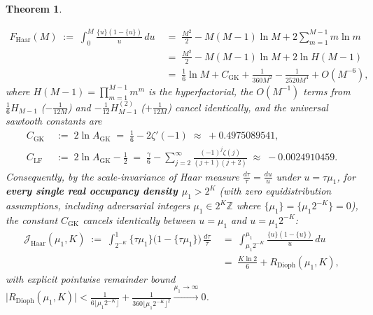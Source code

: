 \documentclass[11pt,reqno]{amsart}
\newtheorem{theorem}{Theorem}[section]
\theoremstyle{definition}
\theoremstyle{remark}
\begin{document}
\begin{theorem}
\begin{enumerate}
  \begin{equation}\label{eq:hyperfactorial_sawtooth_antiderivative}
    \begin{aligned}
      F_{\mathrm{Haar}}(M) \;:=\; \int_0^M \frac{\{u\}(1 - \{u\})}{u}\,du &\;=\; \frac{M^2}{2} - M(M - 1)\ln M + 2\sum_{m=1}^{M-1} m \ln m \\
      &\;=\; \frac{M^2}{2} - M(M - 1)\ln M + 2\ln H(M - 1) \\
      &\;=\; \frac{1}{6}\ln M + C_{\mathrm{GK}} + \frac{1}{360 M^2} - \frac{1}{2520 M^4} + O(M^{-6}),
    \end{aligned}
  \end{equation}
  where $H(M - 1) = \prod_{m=1}^{M-1} m^m$ is the hyperfactorial, the $O(M^{-1})$ terms from $\frac{1}{6}H_{M-1}$ ($-\frac{1}{12M}$) and $-\frac{1}{12}H_{M-1}^{(2)}$ ($+\frac{1}{12M}$) cancel identically, and the universal sawtooth constants are
  \begin{equation}\label{eq:glaisher_kinkelin_sawtooth_constants}
    \begin{aligned}
      C_{\mathrm{GK}} &\;:=\; 2\ln A_{\mathrm{GK}} \;=\; \frac{1}{6} - 2\zeta'(-1) \;\approx\; +0.4975089541, \\
      C_{\mathrm{LF}} &\;:=\; 2\ln A_{\mathrm{GK}} - \frac{1}{2} \;=\; \frac{\gamma}{6} - \sum_{j=2}^\infty \frac{(-1)^j \zeta(j)}{(j + 1)(j + 2)} \;\approx\; -0.0024910459.
    \end{aligned}
  \end{equation}
  Consequently, by the scale-invariance of Haar measure $\frac{d\tau}{\tau} = \frac{du}{u}$ under $u = \tau \mu_1$, for \textbf{every single real occupancy density $\mu_1 > 2^K$} (with zero equidistribution assumptions, including adversarial integers $\mu_1 \in 2^K \mathbb{Z}$ where $\{\mu_1\} = \{\mu_1 2^{-K}\} = 0$), the constant $C_{\mathrm{GK}}$ cancels identically between $u = \mu_1$ and $u = \mu_1 2^{-K}$:
  \begin{equation}\label{eq:pointwise_diophantine_dilation}
    \begin{aligned}
      \mathcal{J}_{\mathrm{Haar}}(\mu_1, K) \;:=\; \int_{2^{-K}}^1 \{\tau \mu_1\}\bigl(1 - \{\tau \mu_1\}\bigr)\,\frac{d\tau}{\tau} &\;=\; \int_{\mu_1 2^{-K}}^{\mu_1} \frac{\{u\}(1 - \{u\})}{u}\,du \\
      &\;=\; \frac{K \ln 2}{6} + R_{\mathrm{Dioph}}(\mu_1, K),
    \end{aligned}
  \end{equation}
  with explicit pointwise remainder bound $\bigl|R_{\mathrm{Dioph}}(\mu_1, K)\bigr| < \frac{1}{6\lfloor \mu_1 2^{-K}\rfloor} + \frac{1}{360\lfloor \mu_1 2^{-K}\rfloor^2} \xrightarrow{\mu_1 \to \infty} 0$.

\end{enumerate}
\end{theorem}
\end{document}
